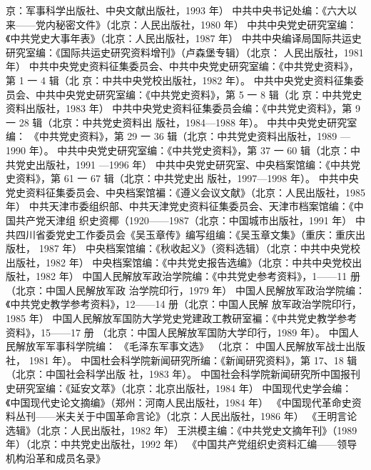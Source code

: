 \begin{thebibliography}{999}
京：军事科学出版社、中央文献出版社，1993 年）
\bibitem{} 中共中央书记处编：《六大以来——党内秘密文件》（北京：人民出版社，1980 年）
\bibitem{} 中共中央党史研究室编：《中共党史大事年表》（北京：人民出版社，1987 年）
\bibitem{} 中共中央编译局国际共运史研究室编：《国际共运史研究资料增刊》（卢森堡专辑）（北京：
人民出版社，1981 年）
\bibitem{} 中共中央党史资料征集委员会、中共中央党史研究室编：《中共党史资料》，第 1 一 4 辑（北
京：中共中央党校出版社，1982 年）。
\bibitem{} 中共中央党史资料征集委员会、中共中央党史研究室编：《中共党史资料》，第 5 一 8 辑（北
京：中共党史资料出版社，1983 年）
\bibitem{} 中共中央党史资料征集委员会编：《中共党史资料》，第 9 一 28 辑（北京：中共党史资料出
版社，1984—1988 年）。
\bibitem{} 中共中央党史研究室编：
《中共党史资料》，第 29 一 36 辑（北京：中共党史资料出版社，1989
—1990 年）。
\bibitem{} 中共中央党史研究室编：《中共党史资料》，第 37 一 60 辑（北京：中共党史出版社，1991
—1996 年）
\bibitem{} 中共中央党史研究室、中央档案馆编：《中共党史资料》，第 61 一 67 辑（北京：中共党史出
版社，1997—1998 年）。
\bibitem{} 中共中央党史资料征集委员会、中央档案馆褊：《遵义会议文献》（北京：人民出版社，1985
年）
\bibitem{} 中共天津市委组织部、中共天津党史资料征集委员会、天津市档案馆编：《中国共产党天津组
\bibitem{} 织史资椰（1920——1987（北京：中国城市出版社，1991 年）
\bibitem{} 中共四川省委党史工作委员会《吴玉章传》编写组编：《吴玉章文集》（重庆：重庆出版杜，
1987 年）
\bibitem{} 中央档案馆编：《秋收起义》（资料选辑）（北京：中共中央党校出版社，1982 年）
\bibitem{} 中央档案馆编：《中共党史报告选编》（北京：中共中央党校出版社，1982 年）
\bibitem{} 中国人民解放军政治学院编：《中共党史参考资料》，1——11 册（北京：中国人民解放军政
治学院印行，1979 年）
\bibitem{} 中国人民解放军政治学院编：《中共党史教学参考资料》，12——14 册（北京：中国人民解
放军政治学院印行，1985 年）
\bibitem{} 中国人民解放军国防大学党史党建政工教研室褊：《中共党史教学参考资料》，15——17 册
（北京：中国人民解放军国防大学印行，1989 年）。
\bibitem{} 中国人民解放军军事科学院编：
《毛泽东军事文选》
（北京：
中国人民解放军战士出版社，
1981
年）。
\bibitem{} 中国杜会科学院新闻研究所编：《新闻研究资料》，第 17、18 辑（北京：中国社会科学出版
社，1983 年）。
\bibitem{} 中国社会科学院新闻研究所中国报刊史研究室编：《延安文萃》（北京：北京出版社，1984
年）
\bibitem{} 中国现代史学会编：《中国现代史论文摘编》（郑州：河南人民出版社，1984 年）
\bibitem{} 《中国现代革命史资料丛刊——米夫关于中国革命言论》（北京：人民出版社，1986 年）
\bibitem{} 《王明言论选辑》（北京：人民出版社，1982 年）
\bibitem{} 王洪模主编：《中共党史文摘年刊》（1989 年）（北京：中共党史出版社，1992 年）
\bibitem{} 《中国共产党组织史资料汇编——领导机构沿革和成员名录》

\end{thebibliography}
